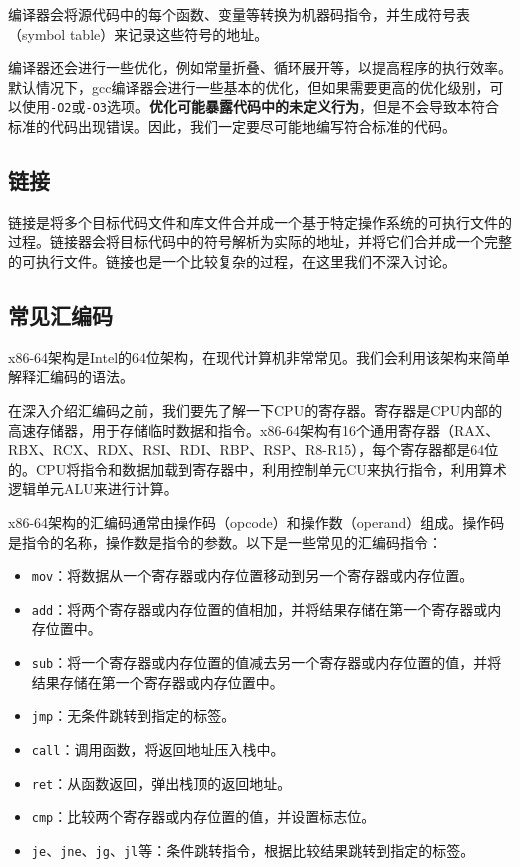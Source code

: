 编译器会将源代码中的每个函数、变量等转换为机器码指令，并生成符号表（symbol table）来记录这些符号的地址。

编译器还会进行一些优化，例如常量折叠、循环展开等，以提高程序的执行效率。默认情况下，gcc编译器会进行一些基本的优化，但如果需要更高的优化级别，可以使用\texttt{-O2}或\texttt{-O3}选项。\textbf{优化可能暴露代码中的未定义行为}，但是不会导致本符合标准的代码出现错误。因此，我们一定要尽可能地编写符合标准的代码。

\subsection{链接}
链接是将多个目标代码文件和库文件合并成一个基于特定操作系统的可执行文件的过程。链接器会将目标代码中的符号解析为实际的地址，并将它们合并成一个完整的可执行文件。链接也是一个比较复杂的过程，在这里我们不深入讨论。

\subsection{常见汇编码}

x86-64架构是Intel的64位架构，在现代计算机非常常见。我们会利用该架构来简单解释汇编码的语法。

在深入介绍汇编码之前，我们要先了解一下CPU的寄存器。寄存器是CPU内部的高速存储器，用于存储临时数据和指令。x86-64架构有16个通用寄存器（RAX、RBX、RCX、RDX、RSI、RDI、RBP、RSP、R8-R15），每个寄存器都是64位的。CPU将指令和数据加载到寄存器中，利用控制单元CU来执行指令，利用算术逻辑单元ALU来进行计算。

x86-64架构的汇编码通常由操作码（opcode）和操作数（operand）组成。操作码是指令的名称，操作数是指令的参数。以下是一些常见的汇编码指令：
\begin{itemize}
  \item \texttt{mov}：将数据从一个寄存器或内存位置移动到另一个寄存器或内存位置。
  \item \texttt{add}：将两个寄存器或内存位置的值相加，并将结果存储在第一个寄存器或内存位置中。
  \item \texttt{sub}：将一个寄存器或内存位置的值减去另一个寄存器或内存位置的值，并将结果存储在第一个寄存器或内存位置中。
  \item \texttt{jmp}：无条件跳转到指定的标签。
  \item \texttt{call}：调用函数，将返回地址压入栈中。
  \item \texttt{ret}：从函数返回，弹出栈顶的返回地址。
  \item \texttt{cmp}：比较两个寄存器或内存位置的值，并设置标志位。
  \item \texttt{je}、\texttt{jne}、\texttt{jg}、\texttt{jl}等：条件跳转指令，根据比较结果跳转到指定的标签。
\end{itemize}

